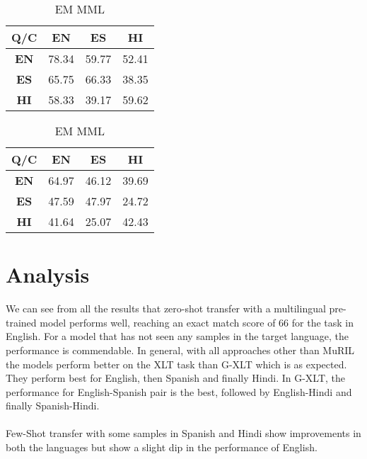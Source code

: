 \documentclass[12pt]{article}   %
\begin{document}
 \begin{table}[H]
        \begin{minipage}{0.5\textwidth}
            \centering
		\begin{tabular}{|c|c|c|c|}
			\hline
 			\textbf{Q/C} &  \textbf{EN} &  \textbf{ES} &  \textbf{HI} \\
			\hline
			 \textbf{EN} & 78.34 & 59.77 & 52.41 \\
			\hline
			\textbf{ES} & 65.75 &  66.33 & 38.35 \\
			\hline
			\textbf{HI} & 58.33 & 39.17 & 59.62 \\
			\hline
		\end{tabular}
		\caption{F1 MML}
	\end{minipage}%
        \hfill
	\begin{minipage}{0.5\textwidth}
         	\centering
			\begin{tabular}{|c|c|c|c|}
				\hline
				 \textbf{Q/C} &  \textbf{EN} &  \textbf{ES} &  \textbf{HI} \\
				\hline
				\textbf{EN} & 64.97 & 46.12 & 39.69 \\
				 \hline
				\textbf{ES} & 47.59 & 47.97 & 24.72 \\
				\hline
				 \textbf{HI} & 41.64 & 25.07 & 42.43\\
				 \hline
			\end{tabular}
			\caption{EM MML}
	\end{minipage}%
\end{table}

\section{Analysis}
We can see from all the results that zero-shot transfer with a multilingual pre-trained model performs well, reaching an exact match score of 66 for the task in English. For a model that has not seen any samples in the target language, the performance is commendable. In general, with all approaches other than MuRIL the models perform better on the XLT task than G-XLT which is as expected. They perform best for English, then Spanish and finally Hindi. In G-XLT, the performance for English-Spanish pair is the best, followed by English-Hindi and finally Spanish-Hindi. 
\paragraph{}
Few-Shot transfer with some samples in Spanish and Hindi show improvements in both the languages but show a slight dip in the performance of English.
\end{document}
